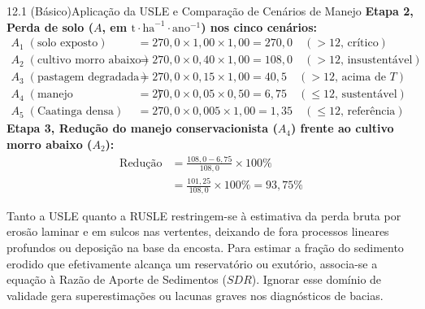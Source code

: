 \begin{boxExemplo}{12.1 (Básico)}{Aplicação da USLE e Comparação de Cenários de Manejo}
{\textbf{Etapa 2, Perda de solo ($A$, em $\text{t}\cdot\text{ha}^{-1}\cdot\text{ano}^{-1}$) nos cinco cenários:}
\begin{align*}
  A_1\; (\text{solo exposto}) &= 270{,}0 \times 1{,}00 \times 1{,}00 = 270{,}0 \quad (> 12\text{, crítico}) \\
  A_2\; (\text{cultivo morro abaixo}) &= 270{,}0 \times 0{,}40 \times 1{,}00 = 108{,}0 \quad (> 12\text{, insustentável}) \\
  A_3\; (\text{pastagem degradada}) &= 270{,}0 \times 0{,}15 \times 1{,}00 = 40{,}5 \quad (> 12\text{, acima de }T) \\
  A_4\; (\text{manejo conservacionista}) &= 270{,}0 \times 0{,}05 \times 0{,}50 = 6{,}75 \quad (\le 12\text{, sustentável}) \\
  A_5\; (\text{Caatinga densa}) &= 270{,}0 \times 0{,}005 \times 1{,}00 = 1{,}35 \quad (\le 12\text{, referência})
\end{align*}
\textbf{Etapa 3, Redução do manejo conservacionista ($A_4$) frente ao cultivo morro abaixo ($A_2$):}
\begin{align*}
\text{Redução} &= \frac{108{,}0 - 6{,}75}{108{,}0}\times 100\% \\
               &= \frac{101{,}25}{108{,}0}\times 100\% = 93{,}75\%
\end{align*}}
\end{boxExemplo}

Tanto a USLE quanto a RUSLE restringem-se à estimativa da perda bruta por erosão laminar e em sulcos nas vertentes, deixando de fora processos lineares profundos ou deposição na base da encosta. Para estimar a fração do sedimento erodido que efetivamente alcança um reservatório ou exutório, associa-se a equação à Razão de Aporte de Sedimentos ($SDR$). Ignorar esse domínio de validade gera superestimações ou lacunas graves nos diagnósticos de bacias.

